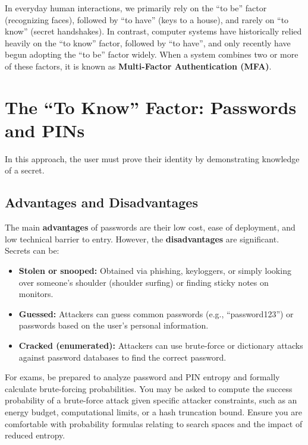 In everyday human interactions, we primarily rely on the ``to be'' factor (recognizing faces), followed by ``to have'' (keys to a house), and rarely on ``to know'' (secret handshakes). In contrast, computer systems have historically relied heavily on the ``to know'' factor, followed by ``to have'', and only recently have begun adopting the ``to be'' factor widely. When a system combines two or more of these factors, it is known as \textbf{Multi-Factor Authentication (MFA)}.

\section{The ``To Know'' Factor: Passwords and PINs}
In this approach, the user must prove their identity by demonstrating knowledge of a secret.

\subsection{Advantages and Disadvantages}
The main \textbf{advantages} of passwords are their low cost, ease of deployment, and low technical barrier to entry. However, the \textbf{disadvantages} are significant. Secrets can be:
\begin{itemize}
    \item \textbf{Stolen or snooped:} Obtained via phishing, keyloggers, or simply looking over someone's shoulder (shoulder surfing) or finding sticky notes on monitors.
    \item \textbf{Guessed:} Attackers can guess common passwords (e.g., ``password123'') or passwords based on the user's personal information.
    \item \textbf{Cracked (enumerated):} Attackers can use brute-force or dictionary attacks against password databases to find the correct password.
\end{itemize}

\begin{tcolorbox}[colback=blue!5!white,colframe=blue!75!black,title=Exam Insight]
For exams, be prepared to analyze password and PIN entropy and formally calculate brute-forcing probabilities. You may be asked to compute the success probability of a brute-force attack given specific attacker constraints, such as an energy budget, computational limits, or a hash truncation bound. Ensure you are comfortable with probability formulas relating to search spaces and the impact of reduced entropy.
\end{tcolorbox}

